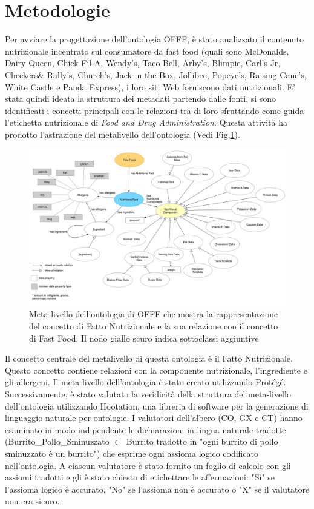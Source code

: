 \section{Metodologie}

Per avviare la progettazione dell'ontologia OFFF, è stato analizzato il contenuto nutrizionale incentrato sul consumatore da fast food (quali sono McDonalds, Dairy Queen, Chick Fil-A, Wendy's, Taco Bell, Arby's, Blimpie, Carl's Jr, Checkers\& Rally's, Church's, Jack in the Box, Jollibee, Popeye's, Raising Cane's, White Castle e Panda Express), i loro siti Web forniscono dati nutrizionali. 
E' stata quindi ideata la struttura dei metadati partendo dalle fonti, si sono identificati i concetti principali con le relazioni tra di loro sfruttando come guida l'etichetta nutrizionale di \emph{Food and Drug Administration}. 
Questa attività ha prodotto l'astrazione del metalivello dell'ontologia (Vedi Fig.\ref{fig:ontology}). 
\begin{figure}[H]
    \centering
    \includegraphics[width=\textwidth]{res/WS_01_Ontology_Meta_Level.jpg}
    \caption{Meta-livello dell'ontologia di OFFF che mostra la rappresentazione del concetto di Fatto Nutrizionale e la sua relazione con il concetto di Fast Food. Il nodo giallo scuro indica sottoclassi aggiuntive}
     \label{fig:ontology}
\end{figure}
Il concetto centrale del metalivello di questa ontologia è il Fatto Nutrizionale. Questo concetto contiene relazioni con la componente nutrizionale, l'ingrediente e gli allergeni. Il meta-livello dell'ontologia è stato creato utilizzando Protégé.
Successivamente, è stato valutato la veridicità della struttura del meta-livello dell'ontologia utilizzando Hootation, una libreria di software per la generazione di linguaggio naturale per ontologie. 
I valutatori dell'albero (CO, GX e CT) hanno esaminato in modo indipendente le dichiarazioni in lingua naturale tradotte (Burrito\_Pollo\_Sminuzzato $\subset$ Burrito tradotto in "ogni burrito di pollo sminuzzato è un burrito") che esprime ogni assioma logico codificato nell'ontologia. 
A ciascun valutatore è stato fornito un foglio di calcolo con gli assiomi tradotti e gli è stato chiesto di etichettare le affermazioni: "Sì" se l'assioma logico è accurato, "No" se l'assioma non è accurato o "X" se il valutatore non era sicuro.

